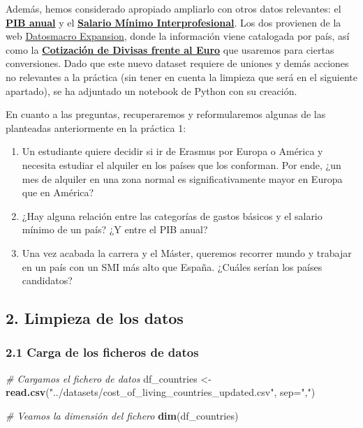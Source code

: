 \documentclass[
]{article}
\newenvironment{Shaded}{\begin{snugshade}}{\end{snugshade}}
\newcommand{\AttributeTok}[1]{\textcolor[rgb]{0.13,0.29,0.53}{#1}}
\newcommand{\CommentTok}[1]{\textcolor[rgb]{0.56,0.35,0.01}{\textit{#1}}}
\newcommand{\FunctionTok}[1]{\textcolor[rgb]{0.13,0.29,0.53}{\textbf{#1}}}
\newcommand{\NormalTok}[1]{#1}
\newcommand{\OtherTok}[1]{\textcolor[rgb]{0.56,0.35,0.01}{#1}}
\newcommand{\StringTok}[1]{\textcolor[rgb]{0.31,0.60,0.02}{#1}}
\begin{document}
Además, hemos considerado apropiado ampliarlo con otros datos
relevantes: el \href{https://datosmacro.expansion.com/pib}{\textbf{PIB
anual}} y el \href{https://datosmacro.expansion.com/smi}{\textbf{Salario
Mínimo Interprofesional}}. Los dos provienen de la web
\href{https://datosmacro.expansion.com/}{Datosmacro Expansion}, donde la
información viene catalogada por país, así como la
\href{https://datosmacro.expansion.com/divisas}{\textbf{Cotización de
Divisas frente al Euro}} que usaremos para ciertas conversiones. Dado
que este nuevo dataset requiere de uniones y demás acciones no
relevantes a la práctica (sin tener en cuenta la limpieza que será en el
siguiente apartado), se ha adjuntado un notebook de Python con su
creación.

En cuanto a las preguntas, recuperaremos y reformularemos algunas de las
planteadas anteriormente en la práctica 1:

\begin{enumerate}
\def\labelenumi{\arabic{enumi}.}
\item
  Un estudiante quiere decidir si ir de Erasmus por Europa o América y
  necesita estudiar el alquiler en los países que los conforman. Por
  ende, ¿un mes de alquiler en una zona normal es significativamente
  mayor en Europa que en América?
\item
  ¿Hay alguna relación entre las categorías de gastos básicos y el
  salario mínimo de un país? ¿Y entre el PIB anual?
\item
  Una vez acabada la carrera y el Máster, queremos recorrer mundo y
  trabajar en un país con un SMI más alto que España. ¿Cuáles serían los
  países candidatos?
\end{enumerate}

\hypertarget{limpieza-de-los-datos}{%
\subsection{2. Limpieza de los datos}\label{limpieza-de-los-datos}}

\hypertarget{carga-de-los-ficheros-de-datos}{%
\subsubsection{2.1 Carga de los ficheros de
datos}\label{carga-de-los-ficheros-de-datos}}

\begin{Shaded}
\begin{Highlighting}[]
\CommentTok{\# Cargamos el fichero de datos}
\NormalTok{df\_countries }\OtherTok{\textless{}{-}} \FunctionTok{read.csv}\NormalTok{(}\StringTok{"../datasets/cost\_of\_living\_countries\_updated.csv"}\NormalTok{, }\AttributeTok{sep=}\StringTok{","}\NormalTok{)}

\CommentTok{\# Veamos la dimensión del fichero}
\FunctionTok{dim}\NormalTok{(df\_countries)}
\end{Highlighting}
\end{Shaded}
\end{document}
